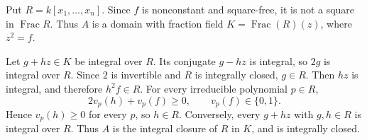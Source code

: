 Put $R=k[x_1,\ldots,x_n]$. Since $f$ is nonconstant and square-free, it is not a square in $\operatorname{Frac}R$. Thus $A$ is a domain with fraction field $K=\operatorname{Frac}(R)(z)$, where $z^2=f$.

Let $g+hz\in K$ be integral over $R$. Its conjugate $g-hz$ is integral, so $2g$ is integral over $R$. Since $2$ is invertible and $R$ is integrally closed, $g\in R$. Then $hz$ is integral, and therefore $h^2f\in R$. For every irreducible polynomial $p\in R$,
\[2v_p(h)+v_p(f)\geq0,\qquad v_p(f)\in\{0,1\}.\]
Hence $v_p(h)\geq0$ for every $p$, so $h\in R$. Conversely, every $g+hz$ with $g,h\in R$ is integral over $R$. Thus $A$ is the integral closure of $R$ in $K$, and is integrally closed.
